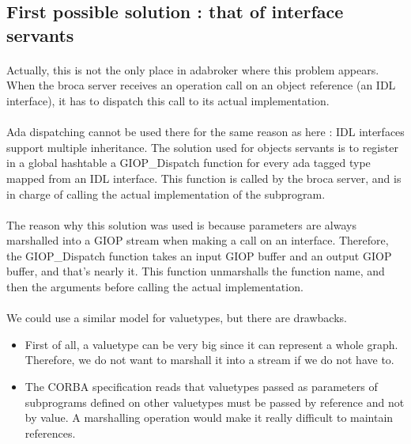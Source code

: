 \subsection{First possible solution : that of interface servants}
\paragraph{} Actually, this is not the only place in adabroker where
this problem appears. When the broca server receives an operation call
on an object reference (an IDL interface), it has to dispatch this
call to its actual implementation.

\paragraph{} Ada dispatching cannot be used there for the same reason
as here : IDL interfaces support multiple inheritance. The solution
used for objects servants is to register in a global hashtable a
GIOP\_Dispatch function for every ada tagged type mapped from an IDL
interface. This function is called by the broca server, and is in
charge of calling the actual implementation of the subprogram.

\paragraph{} The reason why this solution was used is because
parameters are always marshalled into a GIOP stream when making a call
on an interface. Therefore, the GIOP\_Dispatch function takes an input
GIOP buffer and an output GIOP buffer, and that's nearly it. This
function unmarshalls the function name, and then the arguments before
calling the actual implementation.

\paragraph{}We could use a similar model for valuetypes, but there are
drawbacks.
\begin{itemize}
\item First of all, a valuetype can be very big since it can
represent a whole graph. Therefore, we do not want to marshall it into
a stream if we do not have to.
\item The CORBA specification reads that valuetypes passed as
parameters of subprograms defined on other valuetypes must be passed
by reference and not by value. A marshalling operation would make it
really difficult to maintain references.
\end{itemize}

